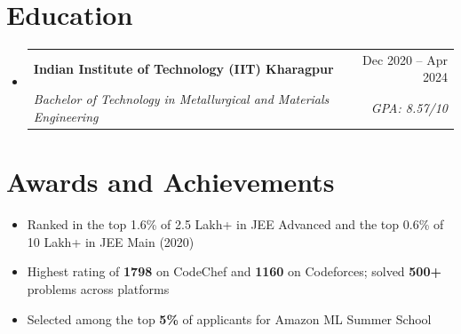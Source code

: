 \documentclass[a4paper,10pt]{article}
\makeatletter
\newcommand{\resumeSubheadingTwo}[4]{
  \item \begin{tabular*}{\linewidth}[t]{@{}l@{\extracolsep{\fill}}r@{}}
    \textbf{#1} & #2 \\
    \textit{#3} & \textit{#4} \\
  \end{tabular*}
}
\newcommand{\resumeItem}[1]{\item #1}
\newcommand{\resumeSubHeadingListStart}{\begin{itemize}[leftmargin=12pt, label=\textbullet, topsep=0pt, itemsep=4pt, parsep=0pt, partopsep=0pt]}
\newcommand{\resumeSubHeadingListEnd}{\end{itemize}}
\newcommand{\resumeItemListStart}{\begin{itemize}[leftmargin=16pt, label=$\circ$, topsep=1pt, itemsep=0.5pt, parsep=0pt, partopsep=0pt]}
\newcommand{\resumeItemListEnd}{\end{itemize}}
\makeatother
\begin{document}
\section{Education}
\resumeSubHeadingListStart
  \resumeSubheadingTwo{Indian Institute of Technology (IIT) Kharagpur}{Dec 2020 -- Apr 2024}
    {Bachelor of Technology in Metallurgical and Materials Engineering}{GPA: 8.57/10}
\resumeSubHeadingListEnd

\section{Awards and Achievements}
\resumeItemListStart
  \resumeItem{Ranked in the top 1.6\% of 2.5 Lakh+ in JEE Advanced and the top 0.6\% of 10 Lakh+ in JEE Main (2020)}
  \resumeItem{Highest rating of \textbf{1798} on CodeChef and \textbf{1160} on Codeforces; solved \textbf{500+} problems across platforms}
  \resumeItem{Selected among the top \textbf{5\%} of applicants for Amazon ML Summer School}
\resumeItemListEnd
\end{document}
